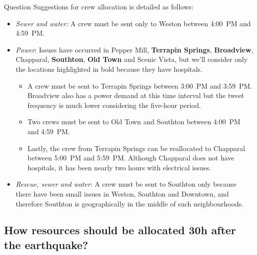 \documentclass{article}
\begin{document}
\begin{section}{Question}
Suggestions for crew allocation is detailed as follows: 

\begin{itemize}
    \item \emph{Sewer and water:} A crew must be sent only to Weston between 
    4:00~PM and 4:59~PM.
    \smallskip 
    \item \emph{Power}: Issues have occurred in Pepper Mill, \textbf{Terrapin
    Springs}, \textbf{Broadview}, Chapparal, \textbf{Southton}, \textbf{Old 
    Town} and Scenic Vista, but we'll consider only the locations 
    highlighted in bold because they have hospitals.
    \begin{itemize}
        \item A crew must be sent to Terrapin Springs between 3:00~PM and
        3:59~PM. Broadview also has a power demand at this time interval but the
        tweet frequency is much lower considering the five-hour period.
        \item Two crews must be sent to Old Town and Southton between 4:00~PM 
        and 4:59~PM.
        \item Lastly, the crew from Terrapin Springs can be reallocated to
        Chapparal between 5:00~PM and 5:59~PM. Although Chapparal does not have
        hospitals, it has been nearly two hours with electrical issues.
    \end{itemize}
    \item \emph{Rescue, sewer and water}: A crew must be sent to Southton only
    because there have been small issues in Weston, Southton and Downtown, and
    therefore Southton is geographically in the middle of such neighbourhoods.
\end{itemize}

\subsection{How resources should be allocated 30h after the earthquake?}
\end{section}
\end{document}
